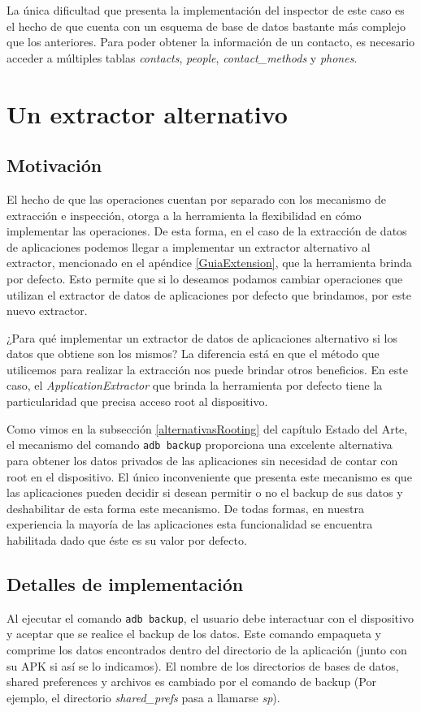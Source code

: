 La única dificultad que presenta la implementación del inspector de este caso es el hecho de que cuenta con un esquema de base de datos bastante más complejo que los anteriores. Para poder obtener la información de un contacto, es necesario acceder a múltiples tablas \emph{contacts}, \emph{people}, \emph{contact\_methods} y \emph{phones}.

\section{Un extractor alternativo}
\subsection{Motivación}
El hecho de que las operaciones cuentan por separado con los mecanismo de extracción e inspección, otorga a la herramienta la flexibilidad en cómo implementar las operaciones. De esta forma, en el caso de la extracción de datos de aplicaciones podemos llegar a implementar un extractor alternativo al extractor, mencionado en el apéndice \ref{GuiaExtension}, que la herramienta brinda por defecto. Esto permite que si lo deseamos podamos cambiar operaciones que utilizan el extractor de datos de aplicaciones por defecto que brindamos, por este nuevo extractor.

¿Para qué implementar un extractor de datos de aplicaciones alternativo si los datos que obtiene son los mismos? La diferencia está en que el método que utilicemos para realizar la extracción nos puede brindar otros beneficios. En este caso, el \emph{ApplicationExtractor} que brinda la herramienta por defecto tiene la particularidad que precisa acceso root al dispositivo.

Como vimos en la subsección \ref{alternativasRooting} del capítulo Estado del Arte, el mecanismo del comando \texttt{adb backup} proporciona una excelente alternativa para obtener los datos privados de las aplicaciones sin necesidad de contar con root en el dispositivo. El único inconveniente que presenta este mecanismo es que las aplicaciones pueden decidir si desean permitir o no el backup de sus datos y deshabilitar de esta forma este mecanismo. De todas formas, en nuestra experiencia la mayoría de las aplicaciones esta funcionalidad se encuentra habilitada dado que éste es su valor por defecto.

\subsection{Detalles de implementación}
Al ejecutar el comando \texttt{adb backup}, el usuario debe interactuar con el dispositivo y aceptar que se realice el backup de los datos. Este comando empaqueta y comprime los datos encontrados dentro del directorio de la aplicación (junto con su APK si así se lo indicamos). El nombre de los directorios de bases de datos, shared preferences y archivos es cambiado por el comando de backup (Por ejemplo, el directorio \emph{shared\_prefs} pasa a llamarse \emph{sp}).


